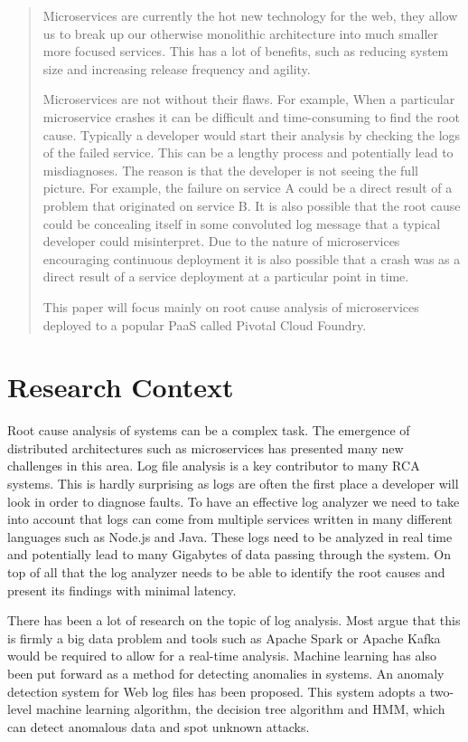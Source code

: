 \begin{abstract}
Microservices are currently the hot new technology for the web, they allow us to break up our otherwise monolithic architecture into much smaller more focused services. This has a lot of benefits, such as reducing system size and increasing release frequency and agility. 

Microservices are not without their flaws. For example, When a particular microservice crashes it can be difficult and time-consuming to find the root cause. Typically a developer would start their analysis by checking the logs of the failed service. This can be a lengthy process and potentially lead to misdiagnoses. The reason is that the developer is not seeing the full picture. For example, the failure on service A could be a direct result of a problem that originated on service B. It is also possible that the root cause could be concealing itself in some convoluted log message that a typical developer could misinterpret. Due to the nature of microservices encouraging continuous deployment it is also possible that a crash was as a direct result of a service deployment at a particular point in time. 

This paper will focus mainly on root cause analysis of microservices deployed to a popular PaaS called Pivotal Cloud Foundry.

\end{abstract}

\chapter{Research Context}

Root cause analysis of systems can be a complex task. The emergence of distributed architectures such as microservices has presented many new challenges in this area. Log file analysis is a key contributor to many RCA systems. This is hardly surprising as logs are often the first place a developer will look in order to diagnose faults. To have an effective log analyzer we need to take into account that logs can come from multiple services written in many different languages such as Node.js and Java. These logs need to be analyzed in real time and potentially lead to many Gigabytes of data passing through the system. On top of all that the log analyzer needs to be able to identify the root causes and present its findings with minimal latency. 

There has been a lot of research on the topic of log analysis. Most argue that this is firmly a big data problem and tools such as Apache Spark\cite{8067504} or Apache Kafka\cite{adamson2014combined} would be required to allow for a real-time analysis. Machine learning has also been put forward as a method for detecting anomalies in systems. An anomaly detection system for Web log files has been proposed. This system adopts a two-level machine learning algorithm, the decision tree algorithm and HMM, which can detect anomalous data and spot unknown attacks\cite{8322600}.

